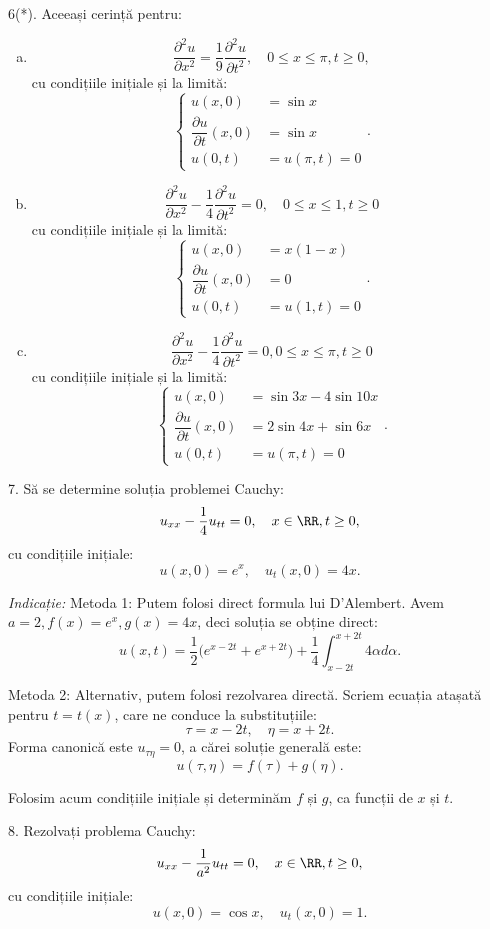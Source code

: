 6(*). Aceeași cerință pentru:
\begin{enumerate}[(a)]
\item
  \[
    \dfrac{\partial^2 u}{\partial x^2} = \dfrac{1}{9}\dfrac{\partial^2 u}{\partial t^2}, %
    \quad 0 \leq x \leq \pi, t \geq 0,
  \]
  cu condițiile inițiale și la limită:
  \[
    \begin{cases}
      u(x, 0) &= \sin x \\
      \dfrac{\partial u}{\partial t}(x, 0) &= \sin x \\
      u(0, t) &= u(\pi, t) = 0
    \end{cases}.
  \]
\item
  \[
    \dfrac{\partial^2 u}{\partial x^2} - \dfrac{1}{4} \dfrac{\partial^2 u}{\partial t^2} = 0, %
    \quad 0 \leq x \leq 1, t \geq 0
  \]
  cu condițiile inițiale și la limită:
  \[
    \begin{cases}
      u(x, 0) &= x(1 - x) \\
      \dfrac{\partial u}{\partial t}(x, 0) &= 0 \\
      u(0, t) &= u(1, t) = 0
    \end{cases}.
  \]
\item
  \[
    \dfrac{\partial^2 u}{\partial x^2} - \dfrac{1}{4} \dfrac{\partial^2 u}{\partial t^2} = 0, %
    0 \leq x \leq \pi, t \geq 0
  \]
  cu condițiile inițiale și la limită:
  \[
    \begin{cases}
      u(x, 0) &= \sin 3x - 4\sin 10x \\
      \dfrac{\partial u}{\partial t}(x, 0) &= 2 \sin 4x + \sin 6x \\
      u(0, t) &= u(\pi, t) = 0
    \end{cases}.
  \]
\end{enumerate}

\vspace{0.3cm}

7. Să se determine soluția problemei Cauchy:
\[
  u_{xx} - \dfrac{1}{4} u_{tt} = 0, \quad x \in \RR, t \geq 0,
\]
cu condițiile inițiale:
\[
  u(x, 0) = e^x, \quad u_t(x, 0) = 4x.
\]

\emph{Indicație:} Metoda 1: Putem folosi direct formula lui D'Alembert. Avem
$ a = 2, f(x) = e^x, g(x) = 4x $, deci soluția se obține direct:
\[
  u(x, t) = \dfrac{1}{2} \Big( e^{x - 2t} + e^{x + 2t} \Big) + %
  \dfrac{1}{4} \int_{x - 2t}^{x + 2t} 4 \alpha d\alpha.
\]

Metoda 2: Alternativ, putem folosi rezolvarea directă. Scriem ecuația
atașată pentru $ t = t(x) $, care ne conduce la substituțiile:
\[
  \tau = x - 2t, \quad \eta = x + 2t.
\]
Forma canonică este $ u_{\tau\eta} = 0 $, a cărei soluție generală
este:
\[
  u(\tau, \eta) = f(\tau) + g(\eta).
\]

Folosim acum condițiile inițiale și determinăm $ f $ și $ g $, ca funcții
de $ x $ și $ t $.

\vspace{0.3cm}

8. Rezolvați problema Cauchy:
\[
  u_{xx} - \dfrac{1}{a^2} u_{tt} = 0, \quad x \in \RR, t \geq 0,
\]
cu condițiile inițiale:
\[
  u(x, 0) = \cos x, \quad u_t(x, 0) = 1.
\]

